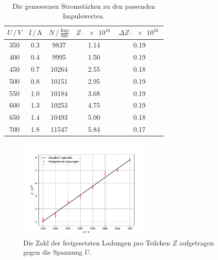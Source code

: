 \begin{table}
  \centering
  \caption{Die gemessenen Stromstärken zu den passenden Impulswerten.}
  \begin{tabular}[t]{ccccc}
    \toprule
    $U\,/\, \si{V} $ &$I \, /\, \si{\A}$ & $N \,/\, \frac{\text{Imp}}{\si{60\second}}$& $Z\cdot\SI{e16}{}$ & $\Delta Z\cdot\SI{e16}{}$\\
    \midrule
    350 & 0.3 & 9837  & 1.14 & 0.19 \\
    400 & 0.4 & 9995  & 1.50 & 0.19 \\
    450 & 0.7 & 10264 & 2.55 & 0.18  \\
    500 & 0.8 & 10151 & 2.95 & 0.19  \\
    550 & 1.0 & 10184 & 3.68 & 0.19  \\
    600 & 1.3 & 10253 & 4.75 & 0.19  \\
    650 & 1.4 & 10493 & 5.00 & 0.18  \\
    700 & 1.8 & 11547 & 5.84 & 0.17  \\
    \bottomrule
    \end{tabular}
  \label{tab:strom}
\end{table}

\begin{figure}
  \centering
  \includegraphics[width=0.6\textwidth]{content/data/zaehlstrom.pdf}
  \caption{Die Zahl der freigesetzten Ladungen pro Teilchen $Z$ aufgetragen gegen die Spannung $U$.}
  \label{fig:z}
\end{figure}